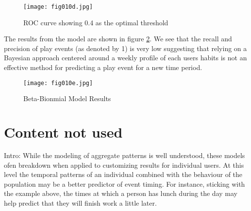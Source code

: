 \begin{figure}[h!]
	\centering
	\texttt{[image: fig010d.jpg]}
	\caption{ROC curve showing 0.4 as the optimal threshold}
	\label{fig10d}
\end{figure} 

The results from the model are shown in figure \ref{fig10e}. We see that the recall and precision of play events (as denoted by 1) is very low suggesting that relying on a Bayesian approach centered around a weekly profile of each users habits is not an effective method for predicting a play event for a new time period.

\begin{figure}[h!]
	\centering
	\texttt{[image: fig010e.jpg]}
	\caption{Beta-Bionmial Model Results}
	\label{fig10e}
\end{figure} 


\section{Content not used} %

Intro:
While the modeling of aggregate patterns is well understood, these models ofen breakdown when applied to customizing results for individual users. At this level the temporal patterns of an individual combined with the behaviour of the population may be a better predictor of event timing. For instance, sticking with the example above, the times at which a person has lunch during the day may help predict that they will finish work a little later.

